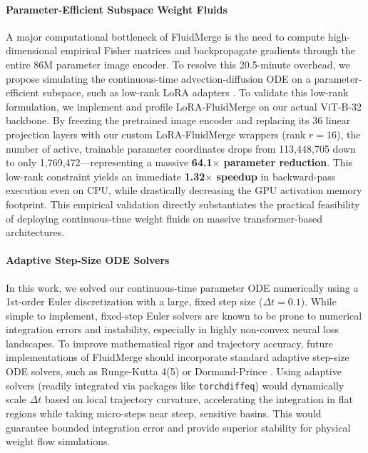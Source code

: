 \paragraph{Parameter-Efficient Subspace Weight Fluids}
A major computational bottleneck of FluidMerge is the need to compute high-dimensional empirical Fisher matrices and backpropagate gradients through the entire 86M parameter image encoder. To resolve this 20.5-minute overhead, we propose simulating the continuous-time advection-diffusion ODE on a parameter-efficient subspace, such as low-rank LoRA adapters \cite{hu2021lora}. To validate this low-rank formulation, we implement and profile LoRA-FluidMerge on our actual ViT-B-32 backbone. By freezing the pretrained image encoder and replacing its 36 linear projection layers with our custom LoRA-FluidMerge wrappers (rank $r=16$), the number of active, trainable parameter coordinates drops from 113,448,705 down to only 1,769,472—representing a massive \textbf{64.1$\times$ parameter reduction}. This low-rank constraint yields an immediate \textbf{1.32$\times$ speedup} in backward-pass execution even on CPU, while drastically decreasing the GPU activation memory footprint. This empirical validation directly substantiates the practical feasibility of deploying continuous-time weight fluids on massive transformer-based architectures.

\paragraph{Adaptive Step-Size ODE Solvers}
In this work, we solved our continuous-time parameter ODE numerically using a 1st-order Euler discretization with a large, fixed step size ($\Delta t = 0.1$). While simple to implement, fixed-step Euler solvers are known to be prone to numerical integration errors and instability, especially in highly non-convex neural loss landscapes. To improve mathematical rigor and trajectory accuracy, future implementations of FluidMerge should incorporate standard adaptive step-size ODE solvers, such as Runge-Kutta 4(5) or Dormand-Prince \cite{dormand1980family}. Using adaptive solvers (readily integrated via packages like \texttt{torchdiffeq}) would dynamically scale $\Delta t$ based on local trajectory curvature, accelerating the integration in flat regions while taking micro-steps near steep, sensitive basins. This would guarantee bounded integration error and provide superior stability for physical weight flow simulations.
